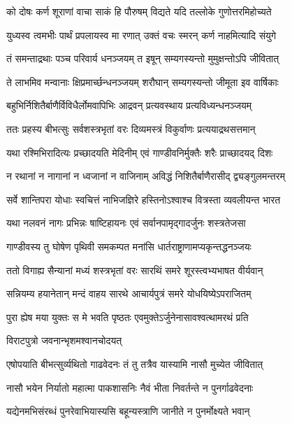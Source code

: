 \twolineshloka
{को दोषः कर्ण शूराणां वाचा साकं हि पौरुषम्}
{विद्यते यदि तल्लोके गुणोत्तरमिहोच्यते}


\twolineshloka
{युध्यस्व त्वमभीः पार्थं प्रपलायस्व मा रणात्}
{उक्तं वचः स्मरन् कर्ण नाहमित्यादि संयुगे}



\twolineshloka
{तं समन्ताद्रथाः पञ्च परिवार्य धनञ्जयम्}
{त इषून् सम्यगस्यन्तो मुमुक्षन्तोऽपि जीवितात्}


\twolineshloka
{ते लाभमिव मन्वानाः क्षिप्रमार्च्छन्धनञ्जयम्}
{शरौघान् सम्यगस्यन्तो जीमूता इव वार्षिकाः}


\twolineshloka
{बहुभिर्निशितैर्बाणैर्विविधैर्लोमवापिभिः}
{आद्रवन् प्रत्यवस्थाय प्रत्यविध्यन्धनञ्जयम्}


\twolineshloka
{ततः प्रहस्य बीभत्सुः सर्वशस्त्रभृतां वरः}
{दिव्यमस्त्रं विकुर्वाणः प्रत्ययाद्रथसत्तमान्}


\twolineshloka
{यथा रश्मिभिरादित्यः प्रच्छादयति मेदिनीम्}
{एवं गाण्डीवनिर्मुक्तैः शरैः प्राच्छादयद् दिशः}


\twolineshloka
{न रथानां न नागानां न ध्वजानां न वाजिनाम्}
{अविद्धं निशितैर्बाणैरासीद् द्व्यङ्गुलमन्तरम्}


\twolineshloka
{सर्वे शान्तिपरा योधाः स्वचित्तं नाभिजज्ञिरे}
{हस्तिनोऽश्वाश्च वित्रस्ता व्यवलीयन्त भारत}


\twolineshloka
{यथा नलवनं नागः प्रभिन्नः षाष्टिहायनः}
{एवं सर्वानपामृद्गादर्जुनः शस्त्रतेजसा}


\twolineshloka
{गाण्डीवस्य तु घोषेण पृथिवी समकम्पत}
{मनांसि धार्तराष्ट्राणामप्यकृन्तद्धनञ्जयः}


\twolineshloka
{ततो विगाह्य सैन्यानां मध्यं शस्त्रभृतां वरः}
{सारथिं समरे शूरस्त्वभ्यभाषत वीर्यवान्}


\twolineshloka
{सन्नियम्य हयानेतान् मन्दं वाहय सारथे}
{आचार्यपुत्रं समरे योधयिष्येऽपराजितम्}


\twolineshloka
{पुरा ह्येष मया युक्तः स मे भवति पृष्ठतः}
{एवमुक्तेऽर्जुनेनासावश्वत्थामरथं प्रति}


\onelineshloka
{विराटपुत्रो जवनान्भृशमश्वानचोदयत्}




\twolineshloka
{एषोपयाति बीभत्सुर्व्यथितो गाढवेदनः}
{तं तु तत्रैव यास्यामि नासौ मुच्येत जीवितात्}




\twolineshloka
{नासौ भयेन निर्यातो महात्मा पाकशासनिः}
{नैवं भीता निवर्तन्ते न पुनर्गाढवेदनाः}


\twolineshloka
{यद्येनमभिसंरब्धं पुनरेवाभियास्यसि}
{बहून्यस्त्राणि जानीते न पुनर्मोक्ष्यते भवान्}


